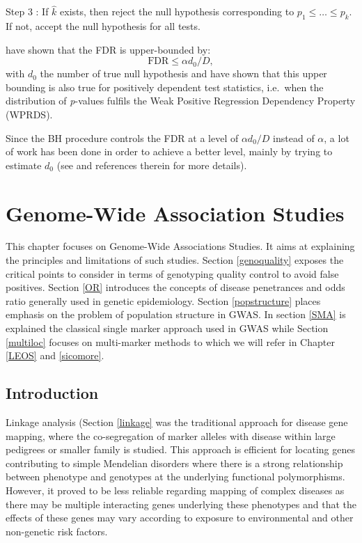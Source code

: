 \documentclass[]{book}
\begin{document}
Step 3 : If \(\hat{k}\) exists, then reject the null hypothesis corresponding
to \(p_1 \leq \dots \leq p_k\). If not, accept the null hypothesis for
all tests.

\citep{benjamini_controlling_1995} have shown that the FDR is upper-bounded
by: \[\text{FDR} \leq \alpha d_0/D,\] with \(d_0\) the number of true null
hypothesis and have shown that this upper bounding is also true for
positively dependent test statistics, i.e.~when the distribution of
\emph{p}-values fulfils the Weak Positive Regression Dependency Property
(WPRDS).

Since the BH procedure controls the FDR at a level of \(\alpha d_0/D\)
instead of \(\alpha\), a lot of work has been done in order to achieve a
better level, mainly by trying to estimate \(d_0\) (see \citep{roquain2010type}
and references therein for more details).

\hypertarget{asso}{%
\chapter{Genome-Wide Association Studies}\label{asso}}

This chapter focuses on Genome-Wide Associations Studies. It aims at explaining the principles and limitations of such studies. Section \ref{genoquality} exposes the critical points to consider in terms of genotyping quality control to avoid false positives. Section \ref{OR} introduces the concepts of disease penetrances and odds ratio generally used in genetic epidemiology. Section \ref{popstructure} places emphasis on the problem of population structure in GWAS. In section \ref{SMA} is explained the classical single marker approach used in GWAS while Section \ref{multiloc} focuses on multi-marker methods to which we will refer in Chapter \ref{LEOS} and \ref{sicomore}.

\hypertarget{introduction-2}{%
\section{Introduction}\label{introduction-2}}

Linkage analysis (Section \ref{linkage} was the traditional approach
for disease gene mapping, where the co-segregation of marker alleles
with disease within large pedigrees or smaller family is studied. This
approach is efficient for locating genes contributing to simple
Mendelian disorders where there is a strong relationship between
phenotype and genotypes at the underlying functional polymorphisms.
However, it proved to be less reliable regarding mapping of complex
diseases as there may be multiple interacting genes underlying these
phenotypes and that the effects of these genes may vary according to
exposure to environmental and other non-genetic risk factors.
\end{document}
